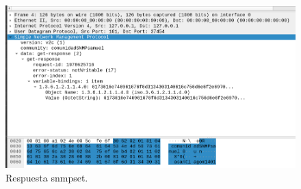 \FloatBarrier
\begin{figure}[htbp!]
		\centering
			\includegraphics[width=.9 \textwidth]{images/snmpset4}
		\caption{Respuesta snmpset.}
		\label{image:snmpset4}
\end{figure}
\FloatBarrier